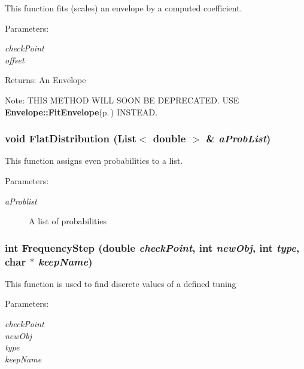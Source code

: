 This function fits (scales) an envelope by a computed coefficient. \begin{Desc}
\item[Parameters:]
\begin{description}
\item[{\em check\-Point}]\item[{\em offset}]\end{description}
\end{Desc}
\begin{Desc}
\item[Returns:]An Envelope \end{Desc}
\begin{Desc}
\item[Note:]THIS METHOD WILL SOON BE DEPRECATED. USE {\bf Envelope::Fit\-Envelope}{\rm (p.\,\pageref{utility_8h_a21})} INSTEAD. \end{Desc}
\subsubsection{\setlength{\rightskip}{0pt plus 5cm}void Flat\-Distribution ({\bf List}$<$ double $>$ \& {\em a\-Prob\-List})}\label{utility_8h_a41}


This function assigns even probabilities to a list. \begin{Desc}
\item[Parameters:]
\begin{description}
\item[{\em a\-Problist}]A list of probabilities \end{description}
\end{Desc}
\subsubsection{\setlength{\rightskip}{0pt plus 5cm}int Frequency\-Step (double {\em check\-Point}, int {\em new\-Obj}, int {\em type}, char $\ast$ {\em keep\-Name})}\label{utility_8h_a17}


This function is used to find discrete values of a defined tuning \begin{Desc}
\item[Parameters:]
\begin{description}
\item[{\em check\-Point}]\item[{\em new\-Obj}]\item[{\em type}]\item[{\em keep\-Name}]\end{description}
\end{Desc}
